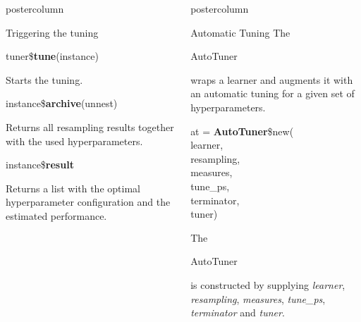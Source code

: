 \documentclass{beamer}
\newlength{\columnheight} %
\newcommand{\codeinline}[1]{\begin{codeboxinline}#1\end{codeboxinline}}
\begin{document}
\begin{frame}[fragile]{}
\begin{columns}
\begin{column}{.245\textwidth}
\begin{beamercolorbox}[center]{postercolumn}
\begin{minipage}{.98\textwidth}
{\begin{myblock}{Triggering the tuning}
							\\
							\begin{codebox}
								tuner\$\textbf{tune}(instance)
							\end{codebox}
							Starts the tuning.
							\\
							\begin{codebox}
								instance\$\textbf{archive}(unnest)
							\end{codebox}
							Returns all resampling results together with the used hyperparameters.
							\\
							\begin{codebox}
								instance\$\textbf{result}
							\end{codebox}
							Returns a list with the optimal hyperparameter configuration and the estimated performance.
						\end{myblock}
					\vfill}
				\end{minipage}
			\end{beamercolorbox}
		\end{column}
		\begin{column}{.245\textwidth}
			\begin{beamercolorbox}[center]{postercolumn}
				\begin{minipage}{.98\textwidth}
					\parbox[t][\columnheight]{\textwidth}{
						\begin{myblock}{Automatic Tuning}
						The \codeinline{AutoTuner} wraps a learner and augments it with an automatic tuning for a given set of hyperparameters.
						\\
						\begin{codeboxmultiline}[width=18cm]
							at = \textbf{AutoTuner}\$new(
\\
							\hspace*{1ex}learner,
\\
							\hspace*{1ex}resampling,
\\
							\hspace*{1ex}measures,
\\
							\hspace*{1ex}tune\_ps,
\\
							\hspace*{1ex}terminator,
\\
							\hspace*{1ex}tuner)
						\end{codeboxmultiline}
						The \codeinline{AutoTuner} is constructed by supplying \textit{learner}, \textit{resampling}, \textit{measures}, \textit{tune\_ps}, \textit{terminator} and \textit{tuner}. 

\end{myblock}}
\end{minipage}
\end{beamercolorbox}
\end{column}
\end{columns}
\end{frame}
\end{document}
